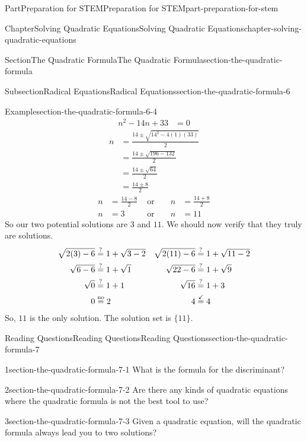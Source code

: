 \documentclass[twoside,10pt,]{book}
\numberwithin{equation}{section}
\newcommand{\substitute}[1]{{\color{blue}{{#1}}}}
\newcommand{\confirm}[1]{\stackrel{\checkmark}{#1}}
\newcommand{\reject}[1]{\stackrel{\text{no}}{#1}}
\newcommand{\wonder}[1]{\stackrel{\text{?}}{#1}}
\newcommand{\amp}{&}
\begin{document}
\begin{partptx}{Part}{Preparation for STEM}{}{Preparation for STEM}{}{}{part-preparation-for-stem}
\begin{chapterptx}{Chapter}{Solving Quadratic Equations}{}{Solving Quadratic Equations}{}{}{chapter-solving-quadratic-equations}
\begin{sectionptx}{Section}{The Quadratic Formula}{}{The Quadratic Formula}{}{}{section-the-quadratic-formula}
\begin{subsectionptx}{Subsection}{Radical Equations}{}{Radical Equations}{}{}{section-the-quadratic-formula-6}
\begin{example}{Example}{}{section-the-quadratic-formula-6-4}
{\begin{align*}
n^2-14n+33\amp=0
\end{align*}
%
\begin{align*}
n\amp=\frac{14\pm\sqrt{14^2-4(1)(33)}}{2}\\
\amp=\frac{14\pm\sqrt{196-132}}{2}\\
\amp=\frac{14\pm\sqrt{64}}{2}\\
\amp=\frac{14\pm8}{2}
\end{align*}
%
\begin{align*}
n\amp=\frac{14-8}{2}\amp\text{ or }\amp\amp n\amp=\frac{14+8}{2}\\
n\amp=3\amp\text{ or }\amp\amp n\amp=11
\end{align*}
So our two potential solutions are \(3\) and \(11\). We should now verify that they truly are solutions.%
\begin{align*}
\sqrt{2(\substitute{3})-6}\amp\wonder{=}1+\sqrt{\substitute{3}-2}\amp\sqrt{2(\substitute{11})-6}\amp\wonder{=}1+\sqrt{\substitute{11}-2}\\
\sqrt{6-6}\amp\wonder{=}1+\sqrt{1}\amp\sqrt{22-6}\amp\wonder{=}1+\sqrt{9}\\
\sqrt{0}\amp\wonder{=}1+1\amp\sqrt{16}\amp\wonder{=}1+3\\
0\amp\reject{=}2\amp4\amp\confirm{=}4
\end{align*}
So, \(11\) is the only solution. The solution set is \(\{11\}\).%
}\end{example}
\end{subsectionptx}
%
%
\typeout{************************************************}
\typeout{************************************************}
%
\begin{reading-questions-subsection}{Reading Questions}{Reading Questions}{}{Reading Questions}{}{}{section-the-quadratic-formula-7}
\begin{divisionexercise}{1}{}{}{section-the-quadratic-formula-7-1}%
What is the formula for the discriminant?%
\end{divisionexercise}%
\begin{divisionexercise}{2}{}{}{section-the-quadratic-formula-7-2}%
Are there any kinds of quadratic equations where the quadratic formula is not the best tool to use?%
\end{divisionexercise}%
\begin{divisionexercise}{3}{}{}{section-the-quadratic-formula-7-3}%
Given a quadratic equation, will the quadratic formula always lead you to two solutions?%
\end{divisionexercise}%

\end{reading-questions-subsection}
\end{sectionptx}
\end{chapterptx}
\end{partptx}
\end{document}
